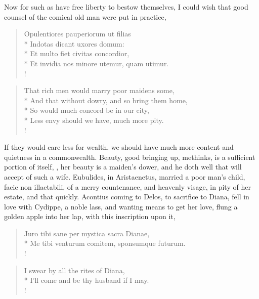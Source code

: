 Now for such as have free liberty to bestow themselves, I could wish
that good counsel of the comical old man were put in practice,
%
\begin{latin}%
\begin{verse}%
Opulentiores pauperiorum ut filias\\*
Indotas dicant uxores domum:\\*
Et multo fiet civitas concordior,\\*
Et invidia nos minore utemur, quam utimur.\\!
\end{verse}%
\end{latin}%
\translationrule%
\begin{verse}%
That rich men would marry poor maidens some,\\*
And that without dowry, and so bring them home,\\*
So would much concord be in our city,\\*
Less envy should we have, much more pity.\\!
\end{verse}%
%

If they would care less for wealth, we should have much more content
and quietness in a commonwealth. Beauty, good bringing up, methinks, is
a sufficient portion of itself, , her
beauty is a maiden's dower, and he doth well that will accept of such a
wife. Eubulides, in Aristaenetus, married a poor man's child,
facie non illaetabili, of a merry countenance, and heavenly visage, in
pity of her estate, and that quickly. Acontius coming to Delos, to
sacrifice to Diana, fell in love with Cydippe, a noble lass, and
wanting means to get her love, flung a golden apple into her lap, with
this inscription upon it,
%
\begin{latin}
\begin{verse}
Juro tibi sane per mystica sacra Dianae,\\*
Me tibi venturum comitem, sponsumque futurum.\\!
\end{verse}
\end{latin}
\translationrule
\begin{verse}
I swear by all the rites of Diana,\\*
I'll come and be thy husband if I may.\\!
\end{verse}

